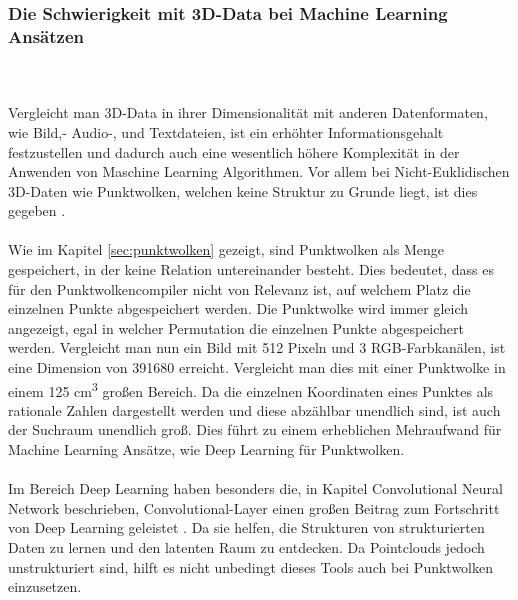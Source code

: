 \documentclass{llncs}
\begin{document}
\subsubsection{Die Schwierigkeit mit 3D-Data bei Machine Learning Ansätzen}\label{sec:3dprobleme}
~\\\\
Vergleicht man 3D-Data in ihrer Dimensionalität mit anderen Datenformaten, wie Bild,- Audio-, und Textdateien, ist ein erhöhter Informationsgehalt festzustellen und dadurch auch eine wesentlich höhere Komplexität in der Anwenden von Maschine Learning Algorithmen. Vor allem bei Nicht-Euklidischen 3D-Daten wie Punktwolken, welchen keine Struktur zu Grunde liegt, ist dies gegeben \cite{3dprob}.
\\\\
Wie im Kapitel \ref{sec:punktwolken} gezeigt, sind Punktwolken als Menge gespeichert, in der keine Relation untereinander besteht. Dies bedeutet, dass es für den Punktwolkencompiler nicht von Relevanz ist, auf welchem Platz die einzelnen Punkte abgespeichert werden. Die Punktwolke wird immer gleich angezeigt, egal in welcher Permutation die einzelnen Punkte abgespeichert werden. Vergleicht man nun ein Bild mit 512 Pixeln und 3 RGB-Farbkanälen, ist eine Dimension von 391680 erreicht. Vergleicht man dies mit einer Punktwolke in einem 125 cm\textsuperscript{3} großen Bereich. Da die einzelnen Koordinaten eines Punktes als rationale Zahlen dargestellt werden und diese abzählbar unendlich sind, ist auch der Suchraum unendlich groß. Dies führt zu einem erheblichen Mehraufwand für Machine Learning Ansätze, wie Deep Learning für Punktwolken.
\\\\
Im Bereich Deep Learning haben besonders die, in Kapitel Convolutional Neural Network beschrieben, Convolutional-Layer einen großen Beitrag zum Fortschritt von Deep Learning geleistet \cite{conv_adv}. Da sie helfen, die Strukturen von strukturierten Daten zu lernen und den latenten Raum zu entdecken. Da Pointclouds jedoch unstrukturiert sind, hilft es nicht unbedingt dieses Tools auch bei Punktwolken einzusetzen.
\newpage
\end{document}
